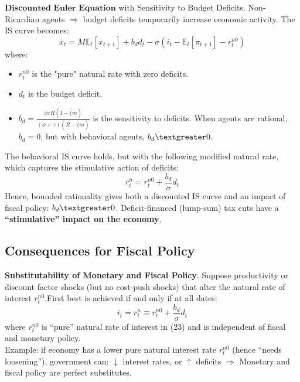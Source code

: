 \documentclass{beamer}
\begin{document}
\begin{frame}{\subsecname}
    $\textbf{Discounted Euler Equation}$ with Sensitivity to Budget Deficits. Non-Ricardian agents $\Rightarrow$ budget deficits temporarily increase economic activity. The IS curve becomes:
    \begin{equation}\tag{44}            x_{t}=M\mathbb{E}_{t}\left[x_{t+1}\right]+b_{d}d_{t}-\sigma\left(i_{t}-\mathbb{E}_{t}\left[\pi_{t+1}\right]-r_{t}^{n0}\right)
    \end{equation}
    where:
    \begin{itemize}
        \item $r_{t}^{n0}$ is the "pure" natural rate with zero deficits.
        \item $d_{t}$ is the budget deficit.
        \item $b_{d}=\frac{\phi rR(1-\overline(m)}{(\phi+\gamma)(R-\overline(m)}$ is the sensitivity to deficits. When agents are rational, $b_{d}=0$, but with behavioral agents, $b_{d}\textgreater0$.
    \end{itemize}
\end{frame}

\begin{frame}{\subsecname}
    The behavioral IS curve holds, but with the following modified natural rate, which captures the stimulative action of deficits:
    \begin{equation}\tag{45}
        r_{t}^{n}=r_{t}^{n0}+\frac{b_{d}}{\sigma}d_{t}
    \end{equation}
    Hence, bounded rationality gives both a discounted IS curve and an impact of fiscal policy: $b_{d} \textgreater 0$. Deficit-financed (lump-sum) tax cuts have a \textbf{“stimulative” impact on the economy}.
\end{frame}

\subsection{Consequences for Fiscal Policy}

\begin{frame}{\subsecname}
    \textbf{Substitutability of Monetary and Fiscal Policy}. Suppose productivity or discount factor shocks (but no cost-push shocks) that alter the natural rate of interest $r_{t}^{n0}$.First best is achieved if and only if at all dates:
    \begin{equation}\tag{46}
        i_{t}=r_{t}^{n}\equiv r_{t}^{n0}+\frac{b_{d}}{\sigma}d_{t}
    \end{equation}
    where $r_{t}^{n0}$ is “pure” natural rate of interest in (23) and is independent of fiscal and monetary policy.\\
    \hfill \linebreak
    Example: if economy has a lower pure natural interest rate $r_{t}^{n0}$ (hence “needs loosening”), government can: $\downarrow$ interest rates, or $\uparrow$ deficits $\Rightarrow$ Monetary and fiscal policy are perfect substitutes.  
\end{frame}
\end{document}
